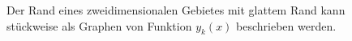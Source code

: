 %
%
%
\begin{figure}
\centering
\caption{Der Rand eines zweidimensionalen Gebietes mit glattem Rand
kann stückweise als Graphen von Funktion $y_k(x)$ beschrieben werden.
\label{buch:felder:fundamentallemma:fig:2drand}}
\end{figure}
